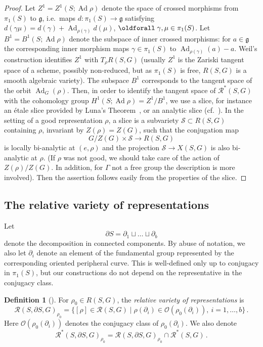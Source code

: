 \documentclass[11pt]{article}
\theoremstyle{definition}
\newtheorem{defi}[theo]{Definition}
\numberwithin{equation}{section}
\numberwithin{figure}{section}
\numberwithin{table}{section}
\DeclareMathOperator{\Ad}{Ad}
\newcommand{\Rcal}{\mathcal{R}}
\newcommand{\Ocal}{\mathcal{O}}
\newcommand{\Scal}{\mathcal{S}}
\newcommand{\gfrk}{\mathfrak{g}}
\newcommand*\bS{b}
\newcommand*\Rg{\Rcal^*}
\renewcommand*{\forall}{\mathrel{\oldforall}}
\begin{document}
\begin{proof}
Let $Z^1=Z^1(S;\Ad\rho)$ denote the space of crossed morphisms from $\pi_1(S)$ to $\gfrk$, i.e.~maps $d\colon \pi_1(S)\to \gfrk$ satisfying $d(\gamma\mu)=d(\gamma)+
\Ad_{\rho(\gamma)}d(\mu)$, $\forall\gamma,\mu\in\pi_1(S)$. Let $B^1=B^1(S;\Ad\rho)$ denote the subspace of inner crossed morphisms: for $a\in\gfrk$ the corresponding inner morphism maps $\gamma\in\pi_1(S)$ to $\Ad_{\rho(\gamma)}(a)-a$. Weil's construction identifies $Z^1$ with $T_{\rho}R(S,G)$ (usually $Z^1$ is the Zariski tangent space of a scheme, possibly non-reduced, but as $\pi_1(S)$ is free, $R(S,G)$ is a smooth algebraic variety). The subspace $B^1$ corresponds to the tangent space of the orbit $\Ad_G(\rho)$. Then, in order to identify the tangent space of $\Rg(S,G)$ with the cohomology group $ H^1(S;\Ad\rho)=Z^1/B^1 $, we use a slice, for instance an étale slice provided by Luna's Theorem~\cite[Theorem~6.1]{AlgebraicGeometryIV}, or an analytic slice (cf.~\cite{JohnsonMillson}). In the setting of a good representation $\rho$, a slice is a subvariety $\Scal\subset R(S,G)$ containing $\rho$, invariant by $Z(\rho)=Z(G)$, such that the conjugation map
\[
G/Z(G)\times \Scal\to R(S,G)
\]
is locally bi-analytic at $(e,\rho)$ and the projection $\Scal\to X(S,G)$ is also bi-analytic at $\rho$. (If $\rho$ was not good, we should take care of the action of $Z(\rho)/Z(G)$. In addition, for $\Gamma$ not a free group the description is more involved). Then the assertion follows easily from the properties of the slice.
\end{proof}


\subsection{The relative variety of representations}\label{subssec:relative}
Let
\[
\partial S=\partial_1\sqcup\dots\sqcup \partial_\bS
\]
denote the decomposition in connected components. By abuse of notation, we also let $\partial_i$ denote an element of the fundamental group represented by the corresponding oriented peripheral curve. This is well-defined only up to conjugacy in $\pi_1(S)$, but our constructions do not depend on the representative in the conjugacy class.

\begin{defi}[{\cite[Section~4.3]{Kapovich}}]
For $\rho_0\in R(S,G)$, the
\emph{relative variety of representations} is
\[
\Rcal(S,\partial S,G)_{\rho_0}=\{[\rho]\in \Rcal(S,G)\mid \rho(\partial_i)\in\Ocal(\rho_0(\partial_i)),\ i=1,\dots,b\}\,.
\]
Here $\Ocal (\rho_0(\partial_i))$ denotes the conjugacy class of $\rho_0(\partial_i)$. We also denote
\[
\Rg(S,\partial S,G)_{\rho_0}=\Rcal(S,\partial S,G)_{\rho_0}\cap \Rg(S,G)\,.
\]
\end{defi}
\end{document}
